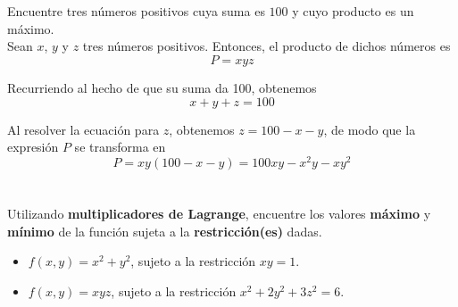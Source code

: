 \documentclass[12pt]{article}
\begin{document}
\section{}

Encuentre tres números positivos cuya suma es $100$ y cuyo producto es un máximo. \\

Sean $x$, $y$ y $z$ tres números positivos. Entonces, el producto de dichos números es $$P=xyz$$

Recurriendo al hecho de que su suma da 100, obtenemos $$x+y+z=100$$

Al resolver la ecuación para $z$, obtenemos $z=100-x-y$, de modo que la expresión $P$ se transforma en $$P=xy(100-x-y)=100xy-x^2y-xy^2$$

\section{}

Utilizando \textbf{multiplicadores de Lagrange}, encuentre los valores \textbf{máximo} y \textbf{mínimo} de la función sujeta a la \textbf{restricción(es)} dadas.

\begin{itemize}[format=\textbf]

\item $f(x, y) = x^2 + y^2$, sujeto a la restricción $xy = 1$.

\item $f(x, y) = xyz$, sujeto a la restricción $x^2 + 2y^2 + 3z^2 = 6$.
  
\end{itemize}
\end{document}
